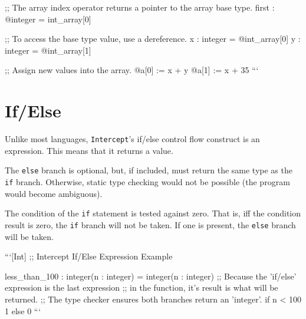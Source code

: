 \documentclass[12pt]{report}
\begin{document}
;; The array index operator returns a pointer to the array base type.
first : @integer = int_array[0]

;; To access the base type value, use a dereference.
x : integer = @int_array[0]
y : integer = @int_array[1]

;; Assign new values into the array.
@a[0] := x + y
@a[1] := x + 35
```

\section{If/Else}
\label{sec:expressions-if_else}

Unlike most languages, \verb|Intercept|'s if/else control flow construct is an expression. This means that it returns a value.

The \verb|else| branch is optional, but, if included, must return the same type as the \verb|if| branch. Otherwise, static type checking would not be possible (the program would become ambiguous).

The condition of the \verb|if| statement is tested against zero. That is, iff the condition result is zero, the \verb|if| branch will not be taken. If one is present, the \verb|else| branch will be taken.

```[Int]
;; Intercept If/Else Expression Example

less_than_100 : integer(n : integer) = integer(n : integer) {
  ;; Because the 'if/else' expression is the last expression
  ;; in the function, it's result is what will be returned.
  ;; The type checker ensures both branches return an 'integer'.
  if n < 100 {
    1
  } else {
    0
  }
}
```
\end{document}
